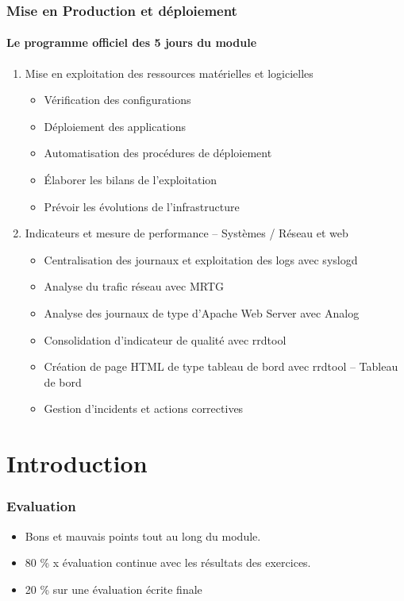 \documentclass{beamer}
\begin{document}
    \begin{frame}
        \frametitle{Mise en Production et déploiement}
        \framesubtitle{Le programme officiel des 5 jours du module}
        \transdissolve
        \begin{enumerate}
            \item Mise en exploitation des ressources matérielles et logicielles
            \begin{itemize}
                \fontsize{8pt}{8pt}\selectfont
                \item Vérification des configurations
                \item Déploiement des applications
                \item Automatisation des procédures de déploiement
                \item Élaborer les bilans de l’exploitation
                \item Prévoir les évolutions de l’infrastructure
            \end{itemize}
            \item Indicateurs et mesure de performance – Systèmes / Réseau et web
            \begin{itemize}
                \fontsize{8pt}{8pt}\selectfont
                \item Centralisation des journaux et exploitation des logs avec syslogd
                \item Analyse du trafic réseau avec MRTG
                \item Analyse des journaux de type d'Apache Web Server avec Analog
                \item Consolidation d'indicateur de qualité avec rrdtool
                \item Création de page HTML de type tableau de bord avec rrdtool – Tableau de bord
                \item Gestion d’incidents et actions correctives
            \end{itemize}
        \end{enumerate}
    \end{frame}


    \section{Introduction}\label{sec:introduction}

    \begin{frame}
        \transdissolve
        \frametitle{Evaluation}
        \begin{itemize}
            \item Bons et mauvais points tout au long du module.
            \item 80 \% x évaluation continue avec les résultats des exercices.
            \item 20 \% sur une évaluation écrite finale
        \end{itemize}
    \end{frame}
\end{document}
